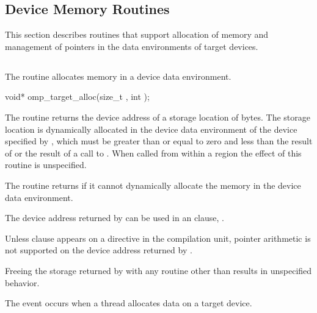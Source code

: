 \begin{ccppspecific}

\section{Device Memory Routines}
\label{sec:Device Memory Routines}
This section describes routines that support allocation of memory and
management of pointers in the data environments of target devices.


\subsection{}
\label{subsec:omp_target_alloc}
\summary
The  routine allocates memory in a device data
environment.


\format
\begin{ompcFunction}
void* omp_target_alloc(size_t , int );
\end{ompcFunction}

\effect
The  routine returns the device address of a storage
location of  bytes. The storage location is dynamically allocated in
the device data environment of the device specified by , which
must be greater than or equal to zero and less than the result of
 or the result of a call to
. When called from within a  region
the effect of this routine is unspecified.

The  routine returns  if it cannot dynamically
allocate the memory in the device data environment.

The device address returned by  can be used in an
 clause, .

Unless  clause appears on a 
directive in the compilation unit, pointer arithmetic is not supported
on the device address returned by .

Freeing the storage returned by  with any routine
other than  results in unspecified behavior.

\events
The  event occurs when a thread allocates 
data on a target device.


\end{ccppspecific}
